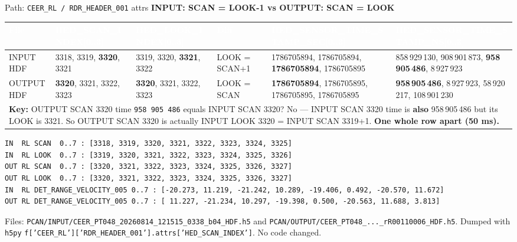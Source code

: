 \documentclass[11pt,a4paper]{article}
\newcommand{\tblhead}[1]{\rowcolor{tableHeader}\textcolor{white}{\textbf{#1}}}
\begin{document}
\begin{tcolorbox}[colback=white,colframe=navy,arc=2mm,boxsep=2mm,title=\textbf{DUMP 1 — Header is the smoking gun (exact bytes from \texttt{h5dump})}]
\scriptsize
\textcolor{midGray}{Path: \texttt{CEER\_RL / RDR\_HEADER\_001} attrs} \hfill \textcolor{bad}{\textbf{INPUT: SCAN = LOOK-1 \quad vs \quad OUTPUT: SCAN = LOOK}}
\vspace{1mm}

\begin{tabular}{@{}p{1.8cm}p{2.2cm}p{2.2cm}p{1.4cm}p{2.6cm}p{2.6cm}@{}}
\tblhead{File} & \tblhead{HED\_SCAN\_INDEX[0..3]} & \tblhead{HED\_LOOK\_INDEX[0..3]} & \tblhead{Diff} & \tblhead{HED\_SENSOR\_TIME\_STAMP\_SEC[0..3]} & \tblhead{HED\_SENSOR\_TIME\_STAMP\_NS[0..3]}\\
\midrule
INPUT HDF & 3318, 3319, \textbf{3320}, 3321 & 3319, 3320, \textbf{3321}, 3322 & \cellcolor{diffRed}LOOK = SCAN+1 & 1786705894, 1786705894, \textbf{1786705894}, 1786705895 & 858\,929\,130, 908\,901\,873, \textbf{958\,905\,486}, 8\,927\,923\\
\rowcolor{lightGray} OUTPUT HDF & \textbf{3320}, 3321, 3322, 3323 & \textbf{3320}, 3321, 3322, 3323 & \cellcolor{diffGreen}LOOK = SCAN & \textbf{1786705894}, 1786705895, 1786705895, 1786705895 & \textbf{958\,905\,486}, 8\,927\,923, 58\,920\,217, 108\,901\,230\\
\midrule
\multicolumn{6}{l}{\textcolor{good}{\textbf{Key:}} OUTPUT SCAN 3320 time \texttt{958\,905\,486} equals INPUT SCAN 3320? No — INPUT SCAN 3320 time is \textbf{also} 958\,905\,486 but its LOOK is 3321. So OUTPUT SCAN 3320 is actually INPUT LOOK 3320 = INPUT SCAN 3319+1. \textbf{One whole row apart (50 ms).}}\\
\end{tabular}
\vspace{2mm}

\begin{lstlisting}[style=dump,caption={\texttt{h5py} exact print — copy/paste to verify}]
IN  RL SCAN  0..7 : [3318, 3319, 3320, 3321, 3322, 3323, 3324, 3325]
IN  RL LOOK  0..7 : [3319, 3320, 3321, 3322, 3323, 3324, 3325, 3326]
OUT RL SCAN  0..7 : [3320, 3321, 3322, 3323, 3324, 3325, 3326, 3327]
OUT RL LOOK  0..7 : [3320, 3321, 3322, 3323, 3324, 3325, 3326, 3327]
IN  RL DET_RANGE_VELOCITY_005 0..7 : [-20.273, 11.219, -21.242, 10.289, -19.406, 0.492, -20.570, 11.672]
OUT RL DET_RANGE_VELOCITY_005 0..7 : [ 11.227, -21.234, 10.297, -19.398, 0.500, -20.563, 11.688, 3.813]
\end{lstlisting}
\textcolor{midGray}{\scriptsize Files: \texttt{PCAN/INPUT/CEER\_PT048\_20260814\_121515\_0338\_b04\_HDF.h5} and \texttt{PCAN/OUTPUT/CEER\_PT048\_...\_rR00110006\_HDF.h5}. Dumped with \texttt{h5py} \texttt{f['CEER\_RL']['RDR\_HEADER\_001'].attrs['HED\_SCAN\_INDEX']}. No code changed.}
\end{tcolorbox}
\end{document}
